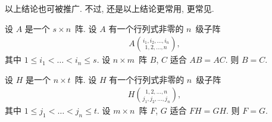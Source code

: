 以上结论也可被推广.
不过, 还是以上结论更常用, 更常见.

\begin{theorem}
    设 \(A\) 是一个 \(s \times n\)~阵.
    设 \(A\) 有一个行列式非零的 \(n\)~级子阵
    \begin{align*}
        A\binom{i_1,i_2,\dots,i_n}{1,2,\dots,n},
    \end{align*}
    其中 \(1 \leq i_1 < \dots < i_n \leq s\).
    设 \(n \times m\)~阵 \(B\), \(C\) 适合 \(AB = AC\).
    则 \(B = C\).

    设 \(H\) 是一个 \(n \times t\)~阵.
    设 \(H\) 有一个行列式非零的 \(n\)~级子阵
    \begin{align*}
        H\binom{1,2,\dots,n}{j_1,j_2,\dots,j_n},
    \end{align*}
    其中 \(1 \leq j_1 < \dots < j_n \leq t\).
    设 \(m \times n\)~阵 \(F\), \(G\) 适合 \(FH = GH\).
    则 \(F = G\).
\end{theorem}

